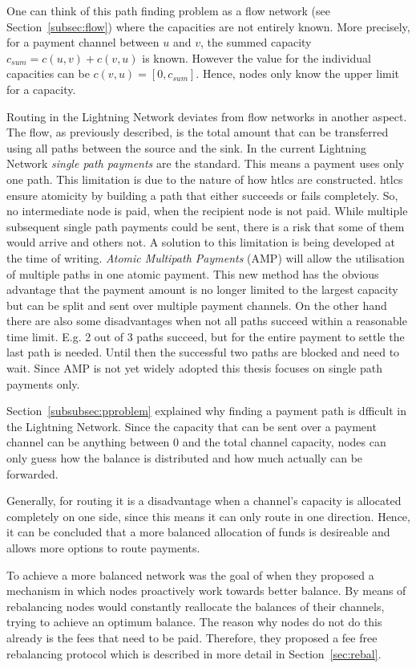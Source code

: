 \documentclass[final]{fhnwreport}       %
\begin{document}
One can think of this path finding problem as a flow network (see Section~\ref{subsec:flow}) where the capacities are not entirely known. More precisely, for a payment channel between $u$ and $v$, the summed capacity $c_{sum} = c(u,v) + c(v,u)$ is known. However the value for the individual capacities can be $c(v,u) = [0, c_{sum}]$. Hence, nodes only know the upper limit for a capacity. 

Routing in the Lightning Network deviates from flow networks in another aspect. The flow, as previously described, is the total amount that can be transferred using all paths between the source and the sink. In the current Lightning Network \emph{single path payments} are the standard. This means a payment uses only one path. This limitation is due to the nature of how \glspl{htlc} are constructed. \glspl{htlc} ensure atomicity by building a path that either succeeds or fails completely. So, no intermediate node is paid, when the recipient node is not paid. While multiple subsequent single path payments could be sent, there is a risk that some of them would arrive and others not. A solution to this limitation is being developed at the time of writing. \emph{Atomic Multipath Payments} (AMP) will allow the utilisation of multiple paths in one atomic payment. This new method has the obvious advantage that the payment amount is no longer limited to the largest capacity but can be split and sent over multiple payment channels. On the other hand there are also some disadvantages when not all paths succeed within a reasonable time limit. E.g. 2 out of 3 paths succeed, but for the entire payment to settle the last path is needed. Until then the successful two paths are blocked and need to wait. Since AMP is not yet widely adopted this thesis focuses on single path payments only.

Section~\ref{subsubsec:pproblem} explained why finding a payment path is dfficult in the Lightning Network. Since the capacity that can be sent over a payment channel can be anything between 0 and the total channel capacity, nodes can only guess how the balance is distributed and how much actually can be forwarded. 

Generally, for routing it is a disadvantage when a channel's capacity is allocated completely on one side, since this means it can only route in one direction. Hence, it can be concluded that a more balanced allocation of funds is desireable and allows more options to route payments.

To achieve a more balanced network was the goal of \textcite{pickhardt_imbalance_2019} when they proposed a mechanism in which nodes proactively work towards better balance. By means of rebalancing nodes would constantly reallocate the balances of their channels, trying to achieve an optimum balance. The reason why nodes do not do this already is the fees that need to be paid. Therefore, they proposed a fee free rebalancing protocol which is described in more detail in Section~\ref{sec:rebal}.
\end{document}
